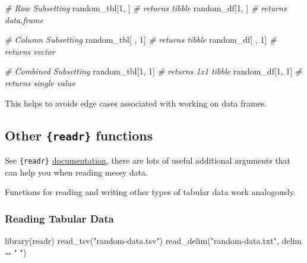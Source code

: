 \documentclass[
  12pt,
]{book}
\newenvironment{Shaded}{\begin{snugshade}}{\end{snugshade}}
\newcommand{\AttributeTok}[1]{\textcolor[rgb]{0.77,0.63,0.00}{#1}}
\newcommand{\CommentTok}[1]{\textcolor[rgb]{0.56,0.35,0.01}{\textit{#1}}}
\newcommand{\DecValTok}[1]{\textcolor[rgb]{0.00,0.00,0.81}{#1}}
\newcommand{\FunctionTok}[1]{\textcolor[rgb]{0.00,0.00,0.00}{#1}}
\newcommand{\NormalTok}[1]{#1}
\newcommand{\StringTok}[1]{\textcolor[rgb]{0.31,0.60,0.02}{#1}}
\begin{document}
\begin{Shaded}
\begin{Highlighting}[]
\CommentTok{\# Row Subsetting}
\NormalTok{random\_tbl[}\DecValTok{1}\NormalTok{, ] }\CommentTok{\# returns tibble}
\NormalTok{random\_df[}\DecValTok{1}\NormalTok{, ]  }\CommentTok{\# returns data.frame}

\CommentTok{\# Column Subsetting}
\NormalTok{random\_tbl[ , }\DecValTok{1}\NormalTok{]      }\CommentTok{\# returns tibble}
\NormalTok{random\_df[ , }\DecValTok{1}\NormalTok{]       }\CommentTok{\# returns vector}

\CommentTok{\# Combined Subsetting}
\NormalTok{random\_tbl[}\DecValTok{1}\NormalTok{, }\DecValTok{1}\NormalTok{]      }\CommentTok{\# returns 1x1 tibble}
\NormalTok{random\_df[}\DecValTok{1}\NormalTok{, }\DecValTok{1}\NormalTok{]       }\CommentTok{\# returns single value}
\end{Highlighting}
\end{Shaded}

This helps to avoids edge cases associated with working on data frames.

\hypertarget{other-readr-functions}{%
\subsection{\texorpdfstring{Other \texttt{\{readr\}} functions}{Other \{readr\} functions}}\label{other-readr-functions}}

See \texttt{\{readr\}} \href{https://readr.tidyverse.org/}{documentation}, there are lots of useful additional arguments that can help you when reading messy data.

Functions for reading and writing other types of tabular data work analogously.

\hypertarget{reading-tabular-data}{%
\subsubsection{Reading Tabular Data}\label{reading-tabular-data}}

\begin{Shaded}
\begin{Highlighting}[]
\FunctionTok{library}\NormalTok{(readr)}
\FunctionTok{read\_tsv}\NormalTok{(}\StringTok{"random{-}data.tsv"}\NormalTok{)}
\FunctionTok{read\_delim}\NormalTok{(}\StringTok{"random{-}data.txt"}\NormalTok{, }\AttributeTok{delim =} \StringTok{" "}\NormalTok{)}
\end{Highlighting}
\end{Shaded}
\end{document}
